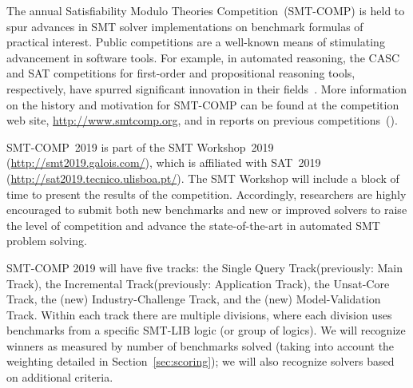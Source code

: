 \documentclass[12pt]{article}
\newcommand{\maintrack}{Single Query Track\xspace}
\newcommand{\inctrack}{Incremental Track\xspace}
\newcommand{\ucoretrack}{Unsat-Core Track\xspace}
\newcommand{\mvaltrack}{Model-Validation Track\xspace}
\newcommand{\challtrack}{Industry-Challenge Track\xspace}
\begin{document}
The annual Satisfiability Modulo Theories Competition~(SMT-COMP) is
held to spur advances in SMT solver implementations on benchmark
formulas of practical interest.  Public competitions are a well-known
means of stimulating advancement in software tools.  For example, in
automated reasoning, the CASC and SAT competitions for first-order and
propositional reasoning tools, respectively, have spurred significant
innovation in their fields~\cite{leberre+03,PSS02}.  More information
on the history and motivation for SMT-COMP can be found at the
competition web site, \url{http://www.smtcomp.org}, and in reports on
previous
competitions~(\cite{SMTCOMP-JAR,SMTCOMP-FMSD,BDOS08,SMTCOMP-2008,CDW14,SMTCOMP-2012,CSW15}).

SMT-COMP~2019 is part of the SMT Workshop~2019
(\url{http://smt2019.galois.com/}),
which is affiliated with SAT~2019 (\url{http://sat2019.tecnico.ulisboa.pt/}).
The SMT Workshop will include a block of time to present the results of the
competition.
%
Accordingly, researchers are highly encouraged to submit both new
benchmarks and new or improved solvers to raise the level of
competition and advance the state-of-the-art in automated SMT problem
solving.

SMT-COMP 2019 will have five tracks: the \maintrack (previously: Main Track),
the \inctrack (previously: Application Track), the \ucoretrack,
the (new) \challtrack, and the (new)
\mvaltrack.
%
Within each track there are multiple divisions, where each division
uses benchmarks from a specific SMT-LIB logic (or group of logics).
We will recognize winners as measured by number of benchmarks solved
(taking into account the weighting detailed in
Section~\ref{sec:scoring}); we will also recognize solvers based on
additional criteria.
\end{document}
